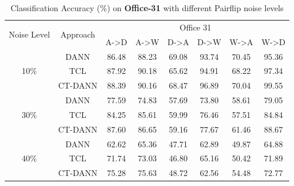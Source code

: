 \begin{center}
\begin{table}[h!]
    \centering
    \begin{tabular}{|c|c|c|c|c|c|c|c|}
    \hline
    \multirow{2}{3em}{Noise Level} & \multirow{2}{4em}{Approach} &  \multicolumn{6}{|c|}{Office 31}\\
    \cline{3-8}
    & & A->D & A->W & D->A & D->W & W->A & W->D\\
    \hline
    
    \multirow{3}{3em}{10\%} & DANN & 86.48 & 88.23 & 69.08 & 93.74 & 70.45 & 95.36 \\
    & TCL & 87.92 & 90.18 & 65.62 & 94.91 & 68.22 & 97.34 \\
    & CT-DANN & 88.39 & 90.16 & 68.47 & 96.89 & 70.04 & 99.55 \\
    \hline
    
    \multirow{3}{3em}{30\%} & DANN & 77.59 & 74.83 & 57.69 & 73.80 & 58.61 & 79.05 \\
    & TCL & 84.25 & 85.61 & 59.99 & 76.46 & 57.51 & 84.84 \\
    & CT-DANN & 87.60 & 86.65 & 59.16 & 77.67 & 61.46 & 88.67 \\
    \hline
    
    \multirow{3}{3em}{40\%} & DANN & 62.62 & 65.36 & 47.71 & 62.89 & 49.87 & 64.88 \\
    & TCL & 71.74 & 73.03 & 46.80 & 65.16 & 50.42 & 71.89 \\
    & CT-DANN & 75.28 & 75.63 & 48.72 & 62.56 & 54.48 & 72.77 \\
    \hline
    \end{tabular}
    \caption{Classification Accuracy (\%) on \textbf{Office-31} with different Pairflip noise levels}
    \label{tab:office_pair}
    \end{table}

\end{center}

